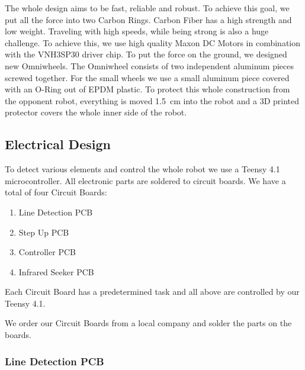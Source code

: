 The whole design aims to be fast, reliable and robust. To achieve this goal, we put all the force
into two Carbon Rings. Carbon Fiber has a high strength and low weight.
\newline
Traveling with high speeds, while being strong is also a huge challenge. To achieve this, we use high quality
Maxon DC Motors in combination with the VNH3SP30 driver chip. To put the force on the ground, we designed
new Omniwheels.
The Omniwheel consists of two independent aluminum pieces screwed together. For the small wheels we use a small
aluminum piece covered with an O-Ring out of EPDM plastic.
\newline
To protect this whole construction from the opponent robot, everything is moved 1.5 cm into the robot and a 3D
printed protector covers the whole inner side of the robot.
\newline

\subsection{Electrical Design}
To detect various elements and control the whole robot we use a Teensy 4.1 microcontroller. All electronic
parts are soldered to circuit boards.
\newline
We have a total of four Circuit Boards:
\begin{enumerate}
    \item{Line Detection PCB} \label{PCB:LD}
    \item{Step Up PCB} \label{PCB:SU}
    \item{Controller PCB} \label{PCB:C}
    \item{Infrared Seeker PCB} \label{PCB:IS}
\end{enumerate}
Each Circuit Board has a predetermined task and all above are controlled by our Teensy 4.1.

We order our Circuit Boards from a local company and solder the parts on the boards.

\subsubsection{Line Detection PCB}

